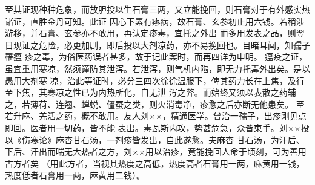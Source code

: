\documentclass[a4paper,12pt,UTF8,twoside]{ctexbook}
\begin{document}
至其证现种种危象，而放胆投以生石膏三两，又立能挽回，则石膏对于有外感实热诸证，直胜金丹可知。此证 
因心下素有疼病，故石膏、玄参初止用六钱。若稍涉游移，并石膏、玄参亦不敢用，再认定疹毒，宜托之外出 
而多用发表之品，则翌日现证之危险，必更加剧，即后投以大剂凉药，亦不易挽回也。目睹耳闻，知孺子罹瘟 
疹之毒，为俗医药误者甚多，故于记此案时，而再四详为申明。 
瘟疫之证，虽宜重用寒凉，然须谨防其泄泻。若泄泻，则气机内陷，即无力托毒外出矣。是以愚用大剂寒 
凉，治此等证时，必分三四次徐徐温服下，俾其药力长在上焦，及行至下焦，其寒凉之性已为内热所化，自无泄 
泻之弊。而始终又须以表散之药辅之，若薄荷、连翘、蝉蜕、僵蚕之类，则火消毒净，疹愈之后亦断无他患矣。 
至若升麻、羌活之药，概不敢用。友人刘××，精通医学。曾治一孺子，出疹刚见点即回。医者用一切药，皆不能 
表出。毒瓦斯内攻，势甚危急，众皆束手。刘××投以《伤寒论》麻杏甘石汤，一剂疹皆发出，自此遂愈。夫麻杏 
甘石汤，为汗后、下后、汗出而喘无大热者之方，刘××用以治疹，竟能挽回人命于顷刻，可为善用古方者矣 
（用此方者，当视其热度之高低，热度高者石膏用一两，麻黄用一钱，热度低者石膏用一两，麻黄用二钱）。 
\end{document}
